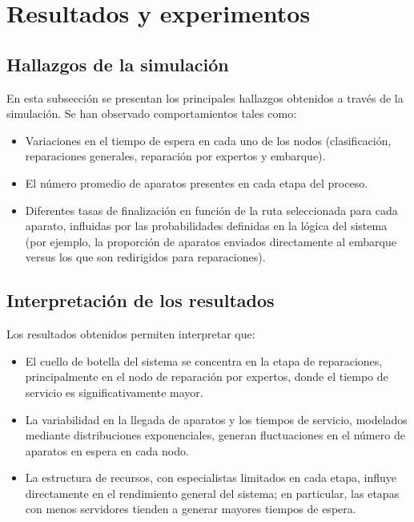 \documentclass[a4paper,12pt]{article}
\begin{document}
\section{Resultados y experimentos}

\subsection{Hallazgos de la simulación}
En esta subsección se presentan los principales hallazgos obtenidos a través de la simulación. Se han observado comportamientos tales como:
\begin{itemize}
    \item Variaciones en el tiempo de espera en cada uno de los nodos (clasificación, reparaciones generales, reparación por expertos y embarque).
    \item El número promedio de aparatos presentes en cada etapa del proceso.
    \item Diferentes tasas de finalización en función de la ruta seleccionada para cada aparato, influidas por las probabilidades definidas en la lógica del sistema (por ejemplo, la proporción de aparatos enviados directamente al embarque versus los que son redirigidos para reparaciones).
\end{itemize}

\subsection{Interpretación de los resultados}
Los resultados obtenidos permiten interpretar que:
\begin{itemize}
    \item El cuello de botella del sistema se concentra en la etapa de reparaciones, principalmente en el nodo de reparación por expertos, donde el tiempo de servicio es significativamente mayor.
    \item La variabilidad en la llegada de aparatos y los tiempos de servicio, modelados mediante distribuciones exponenciales, generan fluctuaciones en el número de aparatos en espera en cada nodo.
    \item La estructura de recursos, con especialistas limitados en cada etapa, influye directamente en el rendimiento general del sistema; en particular, las etapas con menos servidores tienden a generar mayores tiempos de espera.
\end{itemize}
\end{document}
